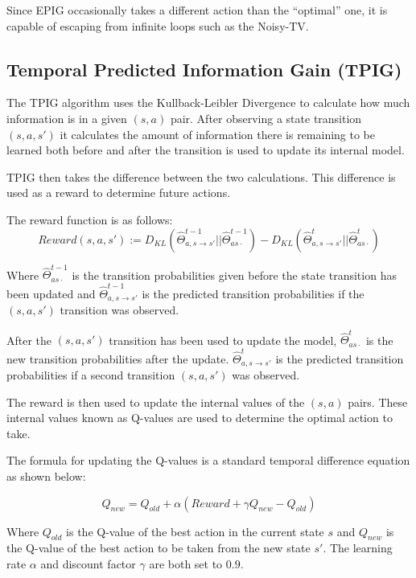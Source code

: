 \documentclass[12pt]{thesis}
\begin{document}
Since EPIG occasionally takes a different action than the ``optimal'' one, it is capable of escaping from infinite loops such as the Noisy-TV.

\subsection{Temporal Predicted Information Gain (TPIG)}
The TPIG algorithm uses the Kullback-Leibler Divergence to calculate how much information is in a given $(s,a)$ pair. After observing a state transition $(s,a,s')$ it calculates the amount of information there is remaining to be learned both before and after the transition is used to update its internal model.

TPIG then takes the difference between the two calculations. This difference is used as a reward to determine future actions.

The reward function is as follows:
\begin{equation}
	Reward(s,a,s') := D_{KL}(\hat{\Theta}_{a,s \rightarrow s'}^{t-1} || \hat{\Theta}_{as\cdot}^{t-1}) - D_{KL}(\hat{\Theta}_{a,s \rightarrow s'}^{t} || \hat{\Theta}_{as\cdot}^{t})
\label{eq:TPIGReward}
\end{equation}

Where $\hat{\Theta}_{as\cdot}^{t-1}$ is the transition probabilities given before the state transition has been updated and $\hat{\Theta}_{a,s \rightarrow s'}^{t-1}$ is the predicted transition probabilities if the $(s,a,s')$ transition was observed.

After the $(s,a,s')$ transition has been used to update the model, $\hat{\Theta}_{as\cdot}^{t}$ is the new transition probabilities after the update. $\hat{\Theta}_{a,s \rightarrow s'}^{t}$ is the predicted transition probabilities if a second transition $(s,a,s')$ was observed.

The reward is then used to update the internal values of the $(s,a)$ pairs. These internal values known as Q-values are used to determine the optimal action to take.

The formula for updating the Q-values is a standard temporal difference equation as shown below:

\[Q_{new} = Q_{old} + \alpha(Reward + \gamma Q_{new} - Q_{old})\]

Where $Q_{old}$ is the Q-value of the best action in the current state $s$ and $Q_{new}$ is the Q-value of the best action to be taken from the new state $s'$. The learning rate $\alpha$ and discount factor $\gamma$ are both set to $0.9$.
\end{document}

